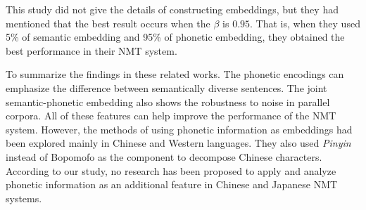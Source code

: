 This study did not give the details of constructing embeddings, but they had mentioned that the best result occurs when the $\beta$ is $0.95$. That is, when they used 5\% of semantic embedding and 95\% of phonetic embedding, they obtained the best performance in their NMT system.

To summarize the findings in these related works. The phonetic encodings can emphasize the difference between semantically diverse sentences. The joint semantic-phonetic embedding also shows the robustness to noise in parallel corpora. All of these features can help improve the performance of the NMT system. However, the methods of using phonetic information as embeddings had been explored mainly in Chinese and Western languages. They also used \textit{Pinyin} instead of Bopomofo as the component to decompose Chinese characters. According to our study, no research has been proposed to apply and analyze phonetic information as an additional feature in Chinese and Japanese NMT systems.
